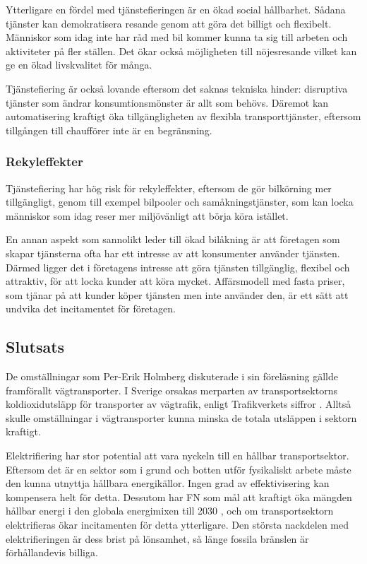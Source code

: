 \documentclass{article}
\begin{document}
Ytterligare en fördel med tjänstefieringen är en ökad social hållbarhet. Sådana tjänster kan demokratisera resande genom att göra det billigt och flexibelt. Människor som idag inte har råd med bil kommer kunna ta sig till arbeten och aktiviteter på fler ställen. Det ökar också möjligheten till nöjesresande vilket kan ge en ökad livskvalitet för många.

Tjänstefiering är också lovande eftersom det saknas tekniska hinder: disruptiva tjänster som ändrar konsumtionsmönster är allt som behövs. Däremot kan  automatisering kraftigt öka tillgängligheten av flexibla transporttjänster, eftersom tillgången till chaufförer inte är en begränsning.

\subsubsection{Rekyleffekter}

Tjänstefiering har hög risk för rekyleffekter, eftersom de gör bilkörning mer tillgängligt, genom till exempel bilpooler och samåkningstjänster, som kan locka människor som idag reser mer miljövänligt att börja köra istället.

En annan aspekt som sannolikt leder till ökad bilåkning är att företagen som skapar tjänsterna ofta har ett intresse av att konsumenter använder tjänsten. Därmed ligger det i företagens intresse att göra tjänsten tillgänglig, flexibel och attraktiv, för att locka kunder att köra mycket. Affärsmodell med fasta priser, som tjänar på att kunder köper tjänsten men inte använder den, är ett sätt att undvika det incitamentet för företagen.

\subsection{Slutsats}

De omställningar som Per-Erik Holmberg diskuterade i sin föreläsning gällde framförallt vägtransporter. I Sverige orsakas merparten av transportsektorns koldioxidutsläpp för transporter av vägtrafik, enligt Trafikverkets siffror . Alltså skulle omställningar i vägtransporter kunna minska de totala utsläppen i sektorn kraftigt.

Elektrifiering har stor potential att vara nyckeln till en hållbar transportsektor. Eftersom det är en sektor som i grund och botten utför fysikaliskt arbete måste den kunna utnyttja hållbara energikällor. Ingen grad av effektivisering kan kompensera helt för detta. Dessutom har FN som mål att kraftigt öka mängden hållbar energi i den globala energimixen till 2030 , och om transportsektorn elektrifieras ökar incitamenten för detta ytterligare. Den största nackdelen med elektrifieringen är dess brist på lönsamhet, så länge fossila bränslen är förhållandevis billiga.
\end{document}
